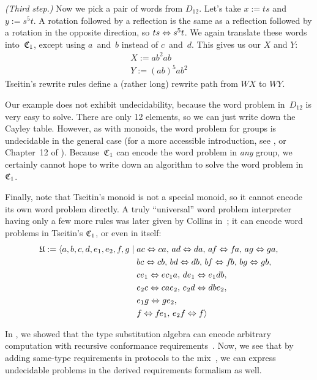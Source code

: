 \documentclass[../generics]{subfiles}
\begin{document}
\smallskip

\emph{(Third step.)} Now we pick a pair of words from $D_{12}$. Let's take $x:=ts$ and $y:=s^5t$. A rotation followed by a reflection is the same as a reflection followed by a rotation in the opposite direction, so $ts\Leftrightarrow s^5t$. We again translate these words into~$\mathfrak{C}_1$, except using $a$~and~$b$ instead of $c$~and~$d$. This gives us our $X$ and $Y$:
\begin{gather*}
X := ab^2ab\\
Y := (ab)^5ab^2
\end{gather*}
Tseitin's rewrite rules define a (rather long) rewrite path from $W\! X$ to $WY$.

Our example does not exhibit undecidability, because the word problem in~$D_{12}$ is very easy to solve. There are only 12 elements, so we can just write down the Cayley table. However, as with monoids, the word problem for groups is undecidable in the general case \cite{undecidablegroup} (for a more accessible introduction, see \cite{undecidablegroup2}, or Chapter~12 of \cite{rotman}). Because~$\mathfrak{C}_1$ can encode the word problem in \emph{any} group, we certainly cannot hope to write down an algorithm to solve the word problem in~$\mathfrak{C}_1$.

Finally, note that Tseitin's monoid is not a special monoid, so it cannot encode its own word problem directly. A truly ``universal'' word problem interpreter having only a few more rules was later given by Collins in~\cite{universalsemigroup}; it can encode word problems in Tseitin's $\mathfrak{C}_1$, or even in itself:
\begin{align*}
\mathfrak{U} := \langle  a,b,c,d,e_1,e_2,f\hspace{-0.08em} ,g \mid {}& ac\Leftrightarrow ca,\,ad\Leftrightarrow da,\,a\hspace{-0.08em} f\Leftrightarrow f\hspace{-0.08em} a,\,ag\Leftrightarrow ga,\\
&bc\Leftrightarrow cb,\, bd\Leftrightarrow db,\, b\hspace{-0.08em} f\Leftrightarrow f\hspace{-0.08em} b,\, bg\Leftrightarrow gb,\\
&ce_1\Leftrightarrow ec_1a,\, de_1\Leftrightarrow e_1db,\\
&e_2c\Leftrightarrow cae_2,\, e_2d\Leftrightarrow dbe_2,\\
&e_1g\Leftrightarrow ge_2,\\
&f\Leftrightarrow f\hspace{-0.08em} e_1,\, e_2f\Leftrightarrow f\rangle
\end{align*}

In , we showed that the type substitution algebra can encode arbitrary computation with recursive conformance requirements~\cite{se0157}. Now, we see that by adding same-type requirements in protocols to the mix~\cite{se0142}, we can express undecidable problems in the derived requirements formalism as well.
\end{document}
